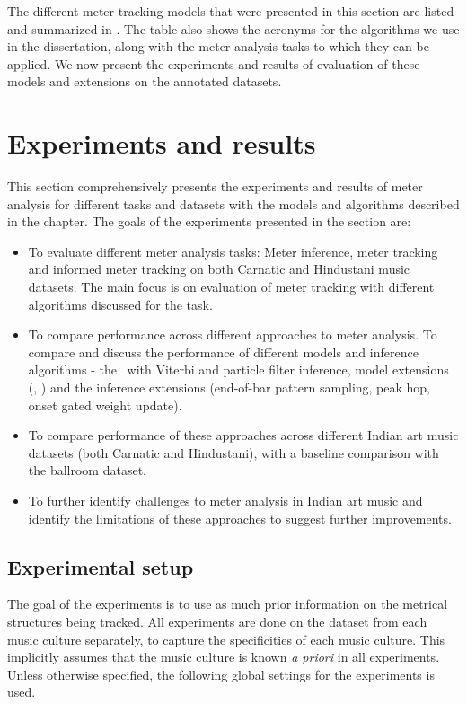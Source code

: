 The different meter tracking models that were presented in this section are listed and summarized in . The table also shows the acronyms for the algorithms we use in the dissertation, along with the meter analysis tasks to which they can be applied. We now present the experiments and results of evaluation of these models and extensions on the annotated datasets.  
\section{Experiments and results}\label{sec:mtrack:expts}
This section comprehensively presents the experiments and results of meter analysis for different tasks and datasets with the models and algorithms described in the chapter. The goals of the experiments presented in the section are: 
\begin{itemize}[leftmargin=*]
  \item To evaluate different meter analysis tasks: Meter inference, meter tracking and informed meter tracking on both Carnatic and Hindustani music datasets. The main focus is on evaluation of meter tracking with different algorithms discussed for the task. 
	\item To compare performance across different approaches to meter analysis. To compare and discuss the performance of different models and inference algorithms - the \bpmodel\ with Viterbi and particle filter inference, model extensions (\momodel, \spmodel) and the inference extensions (end-of-bar pattern sampling, peak hop, onset gated weight update).
	\item To compare performance of these approaches across different Indian art music datasets (both Carnatic and Hindustani), with a baseline comparison with the ballroom dataset. %
	\item To further identify challenges to meter analysis in Indian art music and identify the limitations of these approaches to suggest further improvements.
\end{itemize}
\subsection{Experimental setup}
The goal of the experiments is to use as much prior information on the metrical structures being tracked. All experiments are done on the dataset from each music culture separately, to capture the specificities of each music culture. This implicitly assumes that the music culture is known \textit{a priori} in all experiments. Unless otherwise specified, the following global settings for the experiments is used. 

